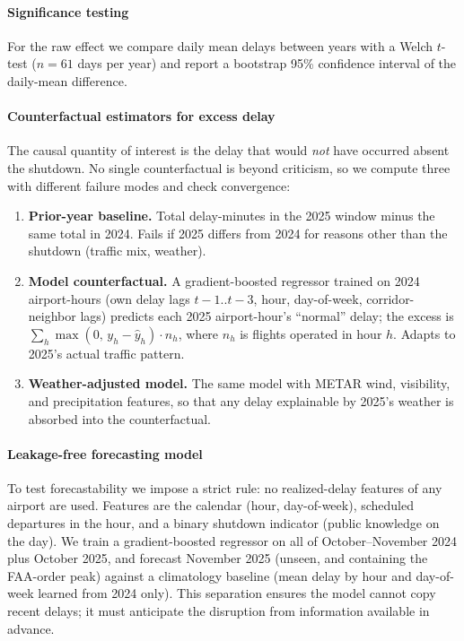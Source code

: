 \documentclass[10pt,journal]{IEEEtran}
\begin{document}
\paragraph{Significance testing}
For the raw effect we compare daily mean delays between years with a Welch
$t$-test ($n{=}61$ days per year) and report a bootstrap 95\% confidence
interval of the daily-mean difference.

\paragraph{Counterfactual estimators for excess delay}
The causal quantity of interest is the delay that would \emph{not} have
occurred absent the shutdown. No single counterfactual is beyond criticism, so
we compute three with different failure modes and check convergence:
\begin{enumerate}
  \item \textbf{Prior-year baseline.} Total delay-minutes in the 2025 window
        minus the same total in 2024. Fails if 2025 differs from 2024 for
        reasons other than the shutdown (traffic mix, weather).
  \item \textbf{Model counterfactual.} A gradient-boosted regressor trained on
        2024 airport-hours (own delay lags $t{-}1..t{-}3$, hour, day-of-week,
        corridor-neighbor lags) predicts each 2025 airport-hour's ``normal''
        delay; the excess is
        $\sum_h \max(0,\, y_h - \hat y_h)\cdot n_h$, where $n_h$ is flights
        operated in hour $h$. Adapts to 2025's actual traffic pattern.
  \item \textbf{Weather-adjusted model.} The same model with METAR wind,
        visibility, and precipitation features, so that any delay explainable
        by 2025's weather is absorbed into the counterfactual.
\end{enumerate}

\paragraph{Leakage-free forecasting model}
To test forecastability we impose a strict rule: no realized-delay features of
any airport are used. Features are the calendar (hour, day-of-week), scheduled
departures in the hour, and a binary shutdown indicator (public knowledge on
the day). We train a gradient-boosted regressor on all of October--November
2024 plus October 2025, and forecast November 2025 (unseen, and containing the
FAA-order peak) against a climatology baseline (mean delay by hour and
day-of-week learned from 2024 only). This separation ensures the model cannot
copy recent delays; it must anticipate the disruption from information available
in advance.
\end{document}
